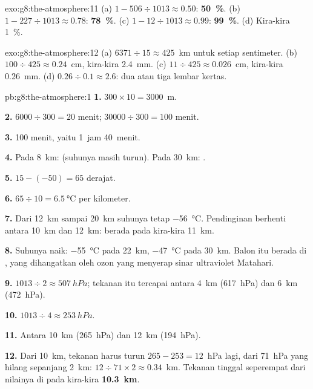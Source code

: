 \begin{solution}{exo:g8:the-atmosphere:11}
(a) $1 - 506 \div 1013 \approx 0.50$: \textbf{50~\%}. (b) $1 - 227 \div
1013 \approx 0.78$: \textbf{78~\%}. (c) $1 - 12 \div 1013 \approx 0.99$:
\textbf{99~\%}. (d) Kira-kira 1~\%.
\end{solution}

\begin{solution}{exo:g8:the-atmosphere:12}
(a) $6371 \div 15 \approx 425$~km untuk setiap sentimeter. (b) $100 \div 425
\approx 0.24$~cm, kira-kira \qty{2.4}{mm}. (c) $11 \div 425 \approx
0.026$~cm, kira-kira \qty{0.26}{mm}. (d) $0.26 \div 0.1 \approx 2.6$: dua
atau tiga lembar kertas.
\end{solution}

\begin{solution}{pb:g8:the-atmosphere:1}
\textbf{1.} $300 \times 10 = 3000$~m.

\textbf{2.} $6000 \div 300 = 20$ menit; $\num{30000} \div 300 = 100$
menit.

\textbf{3.} 100 menit, yaitu 1~jam 40~menit.

\textbf{4.} Pada \qty{8}{km}:  (suhunya masih turun). Pada
\qty{30}{km}: .

\textbf{5.} $15 - (-50) = 65$ derajat.

\textbf{6.} $65 \div 10 = \qty{6.5}{\degreeCelsius}$ per kilometer.

\textbf{7.} Dari \qty{12}{km} sampai \qty{20}{km} suhunya tetap
\qty{-56}{\degreeCelsius}. Pendinginan berhenti antara \qty{10}{km} dan
\qty{12}{km}:  berada pada kira-kira \qty{11}{km}.

\textbf{8.} Suhunya naik: \qty{-55}{\degreeCelsius} pada \qty{22}{km},
\qty{-47}{\degreeCelsius} pada \qty{30}{km}. Balon itu berada di
, yang dihangatkan oleh ozon yang menyerap sinar ultraviolet
Matahari.

\textbf{9.} $1013 \div 2 \approx \qty{507}{hPa}$; tekanan itu tercapai
antara \qty{4}{km} (\qty{617}{hPa}) dan \qty{6}{km} (\qty{472}{hPa}).

\textbf{10.} $1013 \div 4 \approx \qty{253}{hPa}$.

\textbf{11.} Antara \qty{10}{km} (\qty{265}{hPa}) dan \qty{12}{km}
(\qty{194}{hPa}).

\textbf{12.} Dari \qty{10}{km}, tekanan harus turun $265 - 253 =
12$~hPa lagi, dari 71~hPa yang hilang sepanjang 2~km: $12 \div 71 \times 2
\approx 0.34$~km. Tekanan tinggal seperempat dari nilainya di  pada kira-kira \textbf{\qty{10.3}{km}}.
\end{solution}

